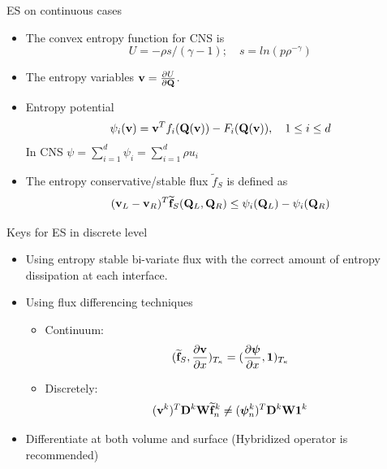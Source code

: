 \begin{frame}{ES on continuous cases}
	\begin{itemize}
		\item The convex entropy function for CNS is \[U = -\rho s/(\gamma-1);\quad s = ln(p\rho^{-\gamma})\]
		\item The entropy variables ${\bf v} = \frac{\partial U}{\partial{\bf Q}}$.
		
		\item Entropy potential \[\psi_i({\bf v}) = {\bf v}^Tf_i({\bf Q}({\bf v})) -F_i({\bf Q}({\bf v})),\quad 1\leq i\leq d\]
		In CNS $\psi = \sum_{i=1}^d\psi_i = \sum_{i=1}^d\rho u_i$
		\item The entropy conservative/stable flux $\widetilde{f}_S$ is defined as \[({\bf{v}}_L-{\bf{v}}_R)^T\widetilde{\bf{f}}_S({\bf{Q}}_L,{\bf{Q}}_R)\leq\psi_i({\bf{Q}}_L)-\psi_i({\bf{Q}}_R)\]
	\end{itemize}
\end{frame}
\begin{frame}{Keys for ES in discrete level}
	\begin{itemize}
		\item Using entropy stable bi-variate flux with the correct amount of entropy dissipation at each interface. 
		
		\item Using flux differencing techniques
		\begin{itemize}
			\item Continuum:
			\[(\widetilde{{\bf f}}_S, \frac{\partial{\bf v}}{\partial x})_{T_\kappa} = (\frac{\partial{\boldsymbol \psi}}{\partial x},{\bf 1})_{T_{\kappa}}\]
			\item Discretely: \[({\bf v}^k)^T{\bf D}^k{\bf W}\widetilde{{\bf f}}_n^k\neq ({\boldsymbol{\psi}}_n^k)^T{\bf D}^k{\bf W}{\bf 1}^k \]
		\end{itemize}
		\item Differentiate at both volume and surface (Hybridized operator is recommended)
	\end{itemize}
\end{frame}

